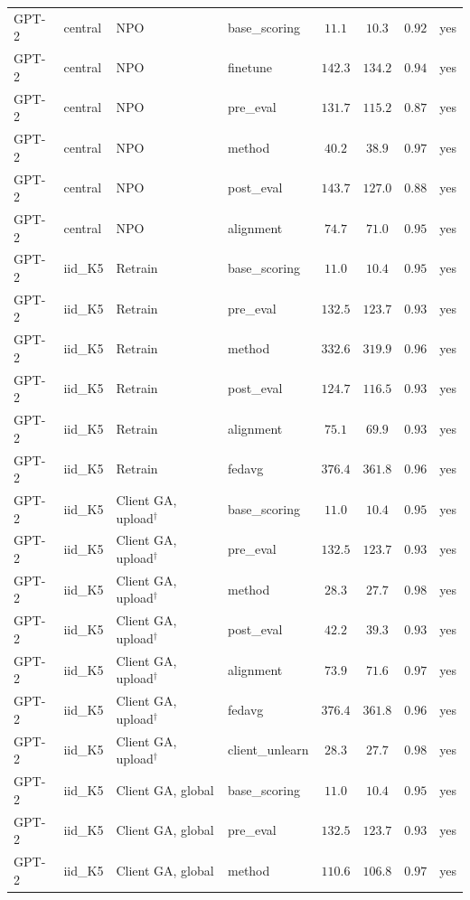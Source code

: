 \begin{table}[t]
\begin{tabular*}{\textwidth}{@{\extracolsep{\fill}}llllcccc@{}}
GPT-2 & central & NPO & base\_scoring & $11.1$ & $10.3$ & $0.92$ & yes \\
GPT-2 & central & NPO & finetune & $142.3$ & $134.2$ & $0.94$ & yes \\
GPT-2 & central & NPO & pre\_eval & $131.7$ & $115.2$ & $0.87$ & yes \\
GPT-2 & central & NPO & method & $40.2$ & $38.9$ & $0.97$ & yes \\
GPT-2 & central & NPO & post\_eval & $143.7$ & $127.0$ & $0.88$ & yes \\
GPT-2 & central & NPO & alignment & $74.7$ & $71.0$ & $0.95$ & yes \\
GPT-2 & iid\_K5 & Retrain & base\_scoring & $11.0$ & $10.4$ & $0.95$ & yes \\
GPT-2 & iid\_K5 & Retrain & pre\_eval & $132.5$ & $123.7$ & $0.93$ & yes \\
GPT-2 & iid\_K5 & Retrain & method & $332.6$ & $319.9$ & $0.96$ & yes \\
GPT-2 & iid\_K5 & Retrain & post\_eval & $124.7$ & $116.5$ & $0.93$ & yes \\
GPT-2 & iid\_K5 & Retrain & alignment & $75.1$ & $69.9$ & $0.93$ & yes \\
GPT-2 & iid\_K5 & Retrain & fedavg & $376.4$ & $361.8$ & $0.96$ & yes \\
GPT-2 & iid\_K5 & Client GA, upload$^{\dagger}$ & base\_scoring & $11.0$ & $10.4$ & $0.95$ & yes \\
GPT-2 & iid\_K5 & Client GA, upload$^{\dagger}$ & pre\_eval & $132.5$ & $123.7$ & $0.93$ & yes \\
GPT-2 & iid\_K5 & Client GA, upload$^{\dagger}$ & method & $28.3$ & $27.7$ & $0.98$ & yes \\
GPT-2 & iid\_K5 & Client GA, upload$^{\dagger}$ & post\_eval & $42.2$ & $39.3$ & $0.93$ & yes \\
GPT-2 & iid\_K5 & Client GA, upload$^{\dagger}$ & alignment & $73.9$ & $71.6$ & $0.97$ & yes \\
GPT-2 & iid\_K5 & Client GA, upload$^{\dagger}$ & fedavg & $376.4$ & $361.8$ & $0.96$ & yes \\
GPT-2 & iid\_K5 & Client GA, upload$^{\dagger}$ & client\_unlearn & $28.3$ & $27.7$ & $0.98$ & yes \\
GPT-2 & iid\_K5 & Client GA, global & base\_scoring & $11.0$ & $10.4$ & $0.95$ & yes \\
GPT-2 & iid\_K5 & Client GA, global & pre\_eval & $132.5$ & $123.7$ & $0.93$ & yes \\
GPT-2 & iid\_K5 & Client GA, global & method & $110.6$ & $106.8$ & $0.97$ & yes \\

\end{tabular*}
\end{table}
